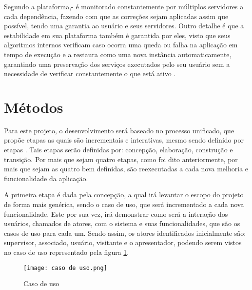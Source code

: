 Segundo a plataforma,- é monitorado constantemente por múltiplos servidores a cada dependência, fazendo com que as correções sejam aplicadas assim que possível, tendo uma garantia ao usuário e seus servidores.  Outro detalhe é que a estabilidade em sua plataforma também é garantida por eles, visto que seus algoritmos internos verificam caso ocorra uma queda ou falha na aplicação em tempo de execução e a restaura como uma nova instância automaticamente, garantindo uma preservação dos serviços executados pelo seu usuário sem a necessidade de verificar constantemente o que está ativo \cite{HEROKU}.

\section{Métodos} \label{metodos}
Para este projeto, o desenvolvimento será baseado no processo unificado, que propõe etapas as quais são incrementais e interativas, mesmo sendo definido por etapas \cite{UNIFICADO}. Tais etapas serão definidas por: concepção, elaboração, construção e transição. Por mais que sejam quatro etapas, como foi dito anteriormente, por mais que sejam as quatro bem definidas, são reexecutadas a cada nova melhoria e funcionalidade da aplicação.

A primeira etapa é dada pela concepção, a qual irá levantar o escopo do projeto de forma mais genérica, sendo o caso de uso, que será incrementado a cada nova funcionalidade. Este por sua vez, irá demonstrar como será a interação dos usuários, chamados de atores, com o sistema e suas funcionalidades, que são os casos de uso para cada um. Sendo assim, os atores identificados inicialmente são: supervisor, associado, usuário, visitante e o apresentador, podendo serem vistos no caso de uso representado pela figura \ref{fig_caso_uso}.

\begin{figure}[H]
    \caption{\label{fig_caso_uso}Caso de uso}
    \vspace{5pt}
    \centering
    \texttt{[image: caso de uso.png]}
    \vspace{5pt}
\end{figure}

